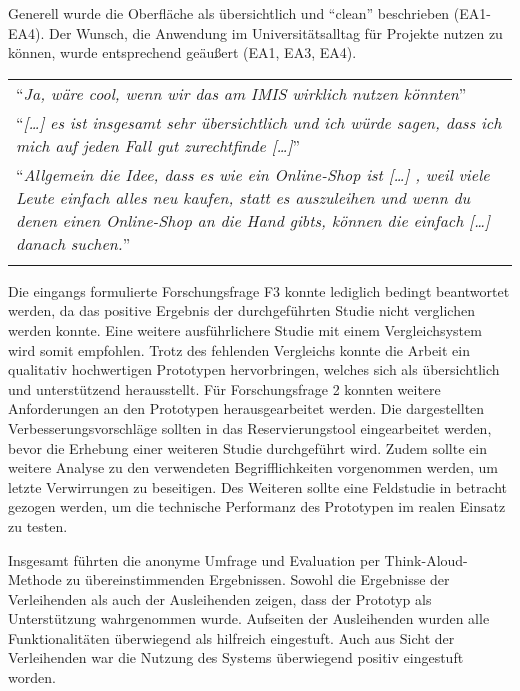 Generell wurde die Oberfläche als übersichtlich und \enquote{clean} beschrieben
(EA1-EA4). Der Wunsch, die Anwendung im Universitätsalltag für Projekte
nutzen zu können, wurde entsprechend geäußert (EA1, EA3, EA4).

\begin{longtable}{p{}} \arrayrulecolor{maincolor}\hline
        \enquote{\textit{Ja, wäre cool, wenn wir das am IMIS wirklich nutzen
        könnten}}                                                      \\
        \enquote{\textit{[\dots] es ist insgesamt sehr übersichtlich und ich würde
        sagen, dass ich mich auf jeden Fall gut zurechtfinde [\dots]}} \\
        \enquote{\textit{Allgemein die Idee, dass es wie ein Online-Shop ist [\dots] ,
                        weil viele Leute einfach alles neu kaufen, statt es auszuleihen und wenn du
                        denen einen Online-Shop an die Hand gibts, können die einfach [\dots] danach
        suchen.}}                                                      \\
        \arrayrulecolor{maincolor}\hline
\end{longtable}

Die eingangs formulierte Forschungsfrage F3 konnte lediglich bedingt beantwortet
werden, da das positive Ergebnis der durchgeführten Studie nicht verglichen
werden konnte. Eine weitere ausführlichere Studie mit einem Vergleichsystem wird
somit empfohlen. Trotz des fehlenden Vergleichs konnte die Arbeit ein qualitativ
hochwertigen Prototypen hervorbringen, welches sich als übersichtlich und
unterstützend herausstellt. Für Forschungsfrage 2 konnten weitere Anforderungen
an den Prototypen herausgearbeitet werden. Die dargestellten Verbesserungsvorschläge
sollten in das Reservierungstool eingearbeitet werden, bevor die Erhebung einer
weiteren Studie durchgeführt wird. Zudem sollte ein weitere Analyse zu den
verwendeten Begrifflichkeiten vorgenommen werden, um letzte Verwirrungen zu
beseitigen. Des Weiteren sollte eine Feldstudie in betracht gezogen werden, um
die technische Performanz des Prototypen im realen Einsatz zu testen.

Insgesamt führten die anonyme Umfrage und Evaluation per Think-Aloud-Methode zu übereinstimmenden
Ergebnissen. Sowohl die Ergebnisse der Verleihenden als auch der Ausleihenden zeigen, dass der
Prototyp als Unterstützung wahrgenommen wurde. Aufseiten der Ausleihenden wurden alle Funktionalitäten
überwiegend als hilfreich eingestuft. Auch aus Sicht der Verleihenden war die Nutzung des Systems
überwiegend positiv eingestuft worden.
